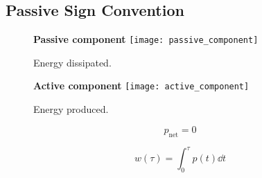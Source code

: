 \documentclass{article}
\begin{document}
\subsection{Passive Sign Convention}
\begin{figure}[H]
    \centering
    \begin{minipage}[H]{0.48\textwidth}
        \textbf{Passive component}
        \centering
        \texttt{[image: passive\_component]}
        \caption{Energy dissipated.}
    \end{minipage}\hfill
    \begin{minipage}[H]{0.48\textwidth}
        \textbf{Active component}
        \centering
        \texttt{[image: active\_component]}
        \caption{Energy produced.}
    \end{minipage}
\end{figure}
\begin{theorem}
    \begin{equation*}
        p_{\mathrm{net}} = 0
    \end{equation*}
\end{theorem}
\begin{theorem}[Energy]
    \begin{equation*}
        w\left( \tau \right) = \int_0^\tau p\left( t \right) \dd{t}
    \end{equation*}
\end{theorem}
\end{document}
